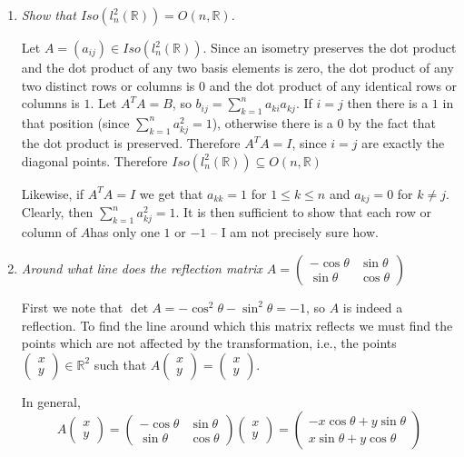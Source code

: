 \documentclass[11pt]{article}
\begin{document}
\begin{enumerate}
\item \emph{Show that $Iso(l^2_n(\mathbb{R})) = O(n, \mathbb{R})$.}

Let $A = (a_{ij}) \in Iso(l^2_n(\mathbb{R}))$.  Since an isometry preserves the dot product and the dot product of any two basis elements is zero, the dot product of any two distinct rows or columns is $0$ and the dot product of any identical rows or columns is $1$. Let $A^TA = B$, so $b_{ij} = \sum_{k=1}^n a_{ki}a_{kj}$.  If $i=j$ then there is a $1$ in that position (since $\sum_{k=1}^n a_{kj}^2 = 1$), otherwise there is a $0$ by the fact that the dot product is preserved.  Therefore $A^TA = I$, since $i=j$ are exactly the diagonal points.  Therefore $Iso(l^2_n(\mathbb{R})) \subseteq O(n, \mathbb{R})$

Likewise, if $A^TA = I$ we get that $a_{kk} = 1$ for $1 \leq k \leq n$ and $a_{kj} = 0$ for $k \neq j$.  Clearly, then $\sum_{k=1}^n a_{kj}^2 = 1$.  It is then sufficient to show that each row or column of $A$has only one $1$ or $-1$ -- I am not precisely sure how.

\item \emph{Around what line does the reflection matrix $A = \left( \begin{array}{cc}
-\cos\theta & \sin\theta \\
\sin\theta & \cos\theta \end{array} \right)$}

First we note that $\det A = -\cos^2\theta - \sin^2\theta = -1$, so $A$ is indeed a reflection.  To find the line around which this matrix reflects we must find the points which are not affected by the transformation, i.e., the points $\left(\begin{array}{c} x \\ y \end{array}\right) \in \mathbb{R}^2$ such that $A\left(\begin{array}{c} x \\ y \end{array}\right) =\left(\begin{array}{c} x \\ y \end{array}\right)$.

In general, 
\[A\left(\begin{array}{c} x \\ y \end{array}\right) = \left( \begin{array}{cc}
-\cos\theta & \sin\theta \\
\sin\theta & \cos\theta \end{array} \right) \left(\begin{array}{c} x \\ y \end{array}\right) = \left(\begin{array}{c} -x\cos\theta + y\sin\theta \\ x\sin\theta + y\cos\theta \end{array}\right) \]


\end{enumerate}
\end{document}
